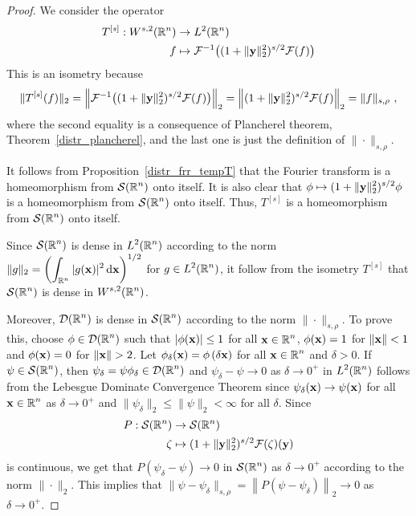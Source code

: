 \begin{proof}
We consider the operator
\begin{align*}
T^{[s]} : W^{s,2}(\mathbb{R}^n) & \to L^2(\mathbb{R}^n) \\
f &\mapsto \mathcal{F}^{-1}\big((1+\|\mathbf{y}\|_2^2)^{s/2} \mathcal{F}(f) \big)  
\end{align*}
This is an isometry because
\[
\|T^{[s]}(f)\|_2 = \left\| \mathcal{F}^{-1}\big((1+\|\mathbf{y}\|_2^2)^{s/2}
\mathcal{F}(f) \big) \right\|_2
= \left\| (1+\|\mathbf{y}\|_2^2)^{s/2} \mathcal{F}(f) \right\|_2
= \| f \|_{s,\rho} \ ,
\]
where the second equality is a consequence of Plancherel theorem,
Theorem~\ref{distr_plancherel}, and the last one is just the
definition of $\|\cdot\|_{s,\rho}$.

It follows from Proposition~\ref{distr_frr_tempT} that the Fourier
transform is a homeomorphism from $\displaystyle \mathcal{S}(\mathbb{R}^n)$ onto
itself.  It is also clear that
$\displaystyle \phi \mapsto (1+\|\mathbf{y}\|_2^2)^{s/2} \phi$ is a
homeomorphism from $\displaystyle \mathcal{S}(\mathbb{R}^n)$ onto itself.  Thus,
$\displaystyle T^{[s]}$ is a homeomorphism from $\displaystyle \mathcal{S}(\mathbb{R}^n)$
onto itself.

Since $\displaystyle \mathcal{S}(\mathbb{R}^n)$ is dense in $\displaystyle L^2(\mathbb{R}^n)$
according to the norm
$\displaystyle \|g\|_2 = \left(\int_{\mathbb{R}^n} |g(\mathbf{x})|^2 \,\mathrm{d}{\mathbf{x}}
\right)^{1/2}$
for $\displaystyle g \in L^2(\mathbb{R}^n)$, it
follow from the isometry $\displaystyle T^{[s]}$ that
$\displaystyle \mathcal{S}(\mathbb{R}^n)$ is dense in $\displaystyle W^{s,2}(\mathbb{R}^n)$.

Moreover, $\displaystyle \mathcal{D}(\mathbb{R}^n)$ is dense in
$\displaystyle \mathcal{S}(\mathbb{R}^n)$ according to the norm
$\|\cdot\|_{s,\rho}$.  To prove this, choose $\displaystyle \phi \in \mathcal{D}(\mathbb{R}^n)$
such that $|\phi(\mathbf{x})| \leq 1$ for all $\displaystyle \mathbf{x} \in \mathbb{R}^n$,
$\phi(\mathbf{x}) = 1$ for $\|\mathbf{x}\|<1$ and
$\phi(\mathbf{x}) = 0$ for $\|\VEC{x}\|>2$.  Let
$\displaystyle \phi_\delta(\mathbf{x}) = \phi\left(\delta \mathbf{x}\right)$
for all $\displaystyle \mathbf{x} \in \mathbb{R}^n$ and $\delta >0$.  If
$\displaystyle \psi \in \mathcal{S}(\mathbb{R}^n)$, then
$\displaystyle \psi_\delta = \psi \phi_\delta \in \mathcal{D}(\mathbb{R}^n)$ and
$\psi_\delta - \psi \to 0$ as $\delta \to 0^+$ in $\displaystyle L^2(\mathbb{R}^n)$
follows from the Lebesgue Dominate Convergence Theorem
since $\psi_{\delta}(\mathbf{x}) \to \psi(\mathbf{x})$ for all
$\displaystyle \mathbf{x} \in \mathbb{R}^n$ as $\delta \to 0^+$ and
$\|\psi_{\delta}\|_2 \leq \|\psi\|_2 < \infty$ for all $\delta$.
Since
\begin{align*}
  P: \mathcal{S}(\mathbb{R}^n) & \to \mathcal{S}(\mathbb{R}^n) \\
  \zeta &\mapsto (1+\|\mathbf{y}\|_2^2)^{s/2} \mathcal{F}(\zeta) (\mathbf{y})
\end{align*}
is continuous, we get that
$P(\psi_\delta - \psi) \to 0$ in $\displaystyle \mathcal{S}(\mathbb{R}^n)$ as $\delta \to 0^+$
according to the norm $\|\cdot\|_2$.
This implies that
$\displaystyle \| \psi - \psi_\delta \|_{s,\rho}
= \left\| P(\psi - \psi_\delta) \right\|_2 \to 0$ as $\delta \to 0^+$.
\end{proof}

